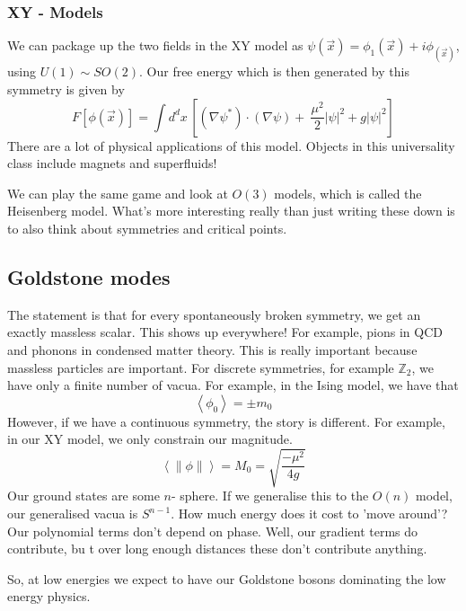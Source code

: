 \subsubsection{XY - Models} 
We can package up the two fields in the XY model 
as $ \psi ( \vec{x} )  = \phi _  1 ( \vec{x} )  + i \phi_ ( \vec{x} ) $, 
using $ U ( 1 ) \sim SO ( 2) $. 
Our free energy which is then generated by this symmetry is 
given by 
\[
 F [ \phi ( \vec{x} ) ] = \int  d^ d x \, 
 \left[  ( \nabla \psi ^ * ) \cdot  ( \nabla \psi ) + \
\frac{\mu ^ 2 }{ 2 } | \psi | ^ 2 + g | \psi | ^ 2\right] 
\] There are a lot of physical applications of this model. 
Objects in this universality class include magnets and superfluids! 

We can play the same game and look at $ O ( 3 ) $ models, which is called the 
Heisenberg model. 
What's more interesting really than just writing these down is to 
also think about symmetries and critical points. 

\subsection{Goldstone modes} 
The statement is that for every spontaneously broken symmetry, 
we get an exactly massless scalar. This shows up everywhere! 
For example, pions in QCD and phonons in condensed matter theory. 
This is really important because massless particles are important. 
For discrete symmetries, for example $ \mathbb{ Z } _ 2 $, 
we have only a finite number of vacua. For example, in the Ising model, 
we have that 
\[
\left< \phi _ 0  \right>  = \pm m _ 0 
\] However, if we have a continuous symmetry, 
the story is different. For example, in our XY model, 
we only constrain our magnitude. 
\[
\left<   \|\phi \| \right> = M _ 0  = \sqrt{ \frac{ - \mu ^ 2 }{ 4 g }}  
\] Our ground states are some $ n  $- sphere. 
If we generalise this to the $ O ( n ) $ model, 
our generalised vacua is $ S ^{ n - 1 }$. 
How much energy does it cost to 'move around'? 
Our polynomial terms don't depend on phase. 
Well, our gradient terms do contribute, bu t
over long enough distances these don't contribute anything. 

So, at low energies we expect to have our Goldstone bosons 
dominating the low energy physics. 

